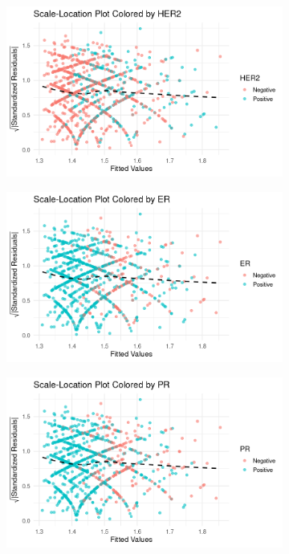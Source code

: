 \documentclass[letter]{article}
\begin{document}
\begin{figure}[htbp]
\centering

\begin{subfigure}[b]{0.32\textwidth}
    \includegraphics[width=\textwidth]{Color1.png}
    
\end{subfigure}
\hfill
\begin{subfigure}[b]{0.32\textwidth}
    \includegraphics[width=\textwidth]{Color2.png}
\end{subfigure}
\hfill
\begin{subfigure}[b]{0.32\textwidth}
    \includegraphics[width=\textwidth]{Color3.png}
\end{subfigure}


\end{figure}
\end{document}

